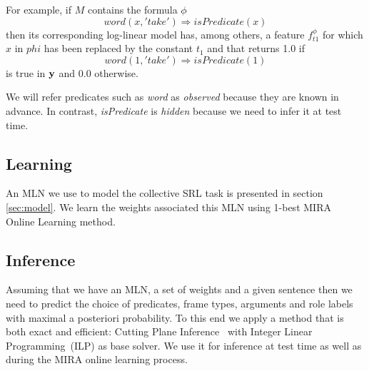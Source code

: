 For example, if $M$ contains the formula $\phi$ \[
word\left(x,'take'\right)\Rightarrow isPredicate\left(x\right)\]
then its corresponding log-linear model has, among others, a feature 
$f_{t1}^{\phi}$ for which $x$ in $phi$ has been replaced by the constant $t_1$ and that returns 1.0 if \[
word\left(1,'take'\right)\Rightarrow isPredicate\left(1\right)\]
is true in $\mathbf{y}$ and 0.0 otherwise.

We will refer predicates such as \emph{word} as \emph{observed} because they are known in advance. In contrast, \emph{isPredicate} is \emph{hidden} because we need to infer it at test time.

\subsection{Learning}

An MLN we use to model the collective SRL task is presented in section \ref{sec:model}. We learn the weights associated this MLN using 1-best MIRA~\citep{crammer01ultraconservative} Online Learning method. %

\subsection{Inference}


Assuming that we have an MLN, a set of weights and a given sentence then we need to predict the choice of predicates, frame types, arguments and role labels with maximal a posteriori probability. To this end we apply a method that is both exact and efficient: Cutting Plane Inference~\citep[CPI,][]{riedel08improving} with Integer Linear Programming~(ILP) as base solver. We use it for inference at test time as well as during the MIRA online learning process.

